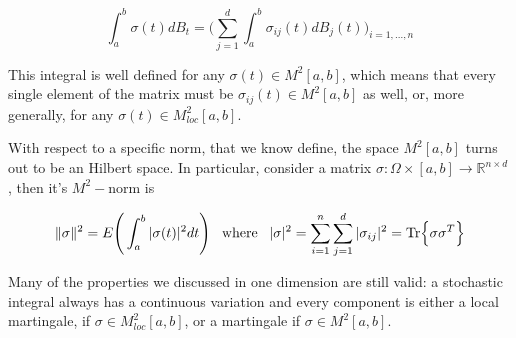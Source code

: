 \begin{equation*}
    \int_a^b \sigma(t) dB_t = \Bigg( \sum_{j=1}^d \int_a^b \sigma_{ij}(t) dB_j(t) \Bigg)_{i = 1,...,n}
\end{equation*}

This integral is well defined for any $\sigma(t) \in M^2[a,b]$, which means that every single element of the matrix must be $\sigma_{ij}(t) \in M^2[a,b]$ as well, or, more generally, for any $\sigma(t) \in M^2_{loc}[a,b]$. 

With respect to a specific norm, that we know define, the space $M^2[a,b]$ turns out to be an Hilbert space. In particular, consider a matrix $\sigma : \Omega \times [a,b] \to \mathbb{R}^{n \times d}$, then it's $M^2-$norm is

\begin{gather*}
    \Vert \sigma \Vert^2 = E\Bigg( \int_a^b \vert \sigma(t) \vert^2 dt \Bigg) \;\;\; \text{where} \;\;\; \vert \sigma \vert^2 = \sum_{i=1}^n \sum_{j=1}^d \vert \sigma_{ij} \vert^2 = \Tr{\sigma \sigma^T}
\end{gather*}

Many of the properties we discussed in one dimension are still valid: a stochastic integral always has a continuous variation and every component is either a local martingale, if $\sigma \in M^2_{loc}[a,b]$, or a martingale if $\sigma \in M^2[a,b]$. 

